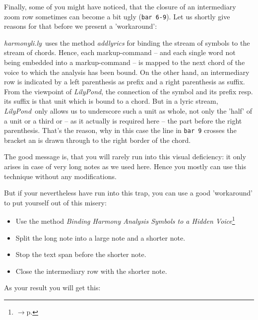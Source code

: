 \documentclass[
  DIV=calc,
  BCOR=5mm,
  12pt,
  headings=small,
  oneside,
  abstract=true,
  toc=bib,
  xcolor=dvipsnames,
  openany,
  ngerman,english]{scrartcl}
\newcommand{\acc}[0]{\textit}
\newcommand{\ra}[0]{$\rightarrow$}
\newcommand{\hlyn}[0]{\textit{harmonyli.ly}}
\newcommand{\lily}[0]{\textit{LilyPond}}
\newcommand{\has}[1]{\textit{Harmony Analysis Symbol#1}}
\begin{document}
Finally, some of you might have noticed, that the closure of an intermediary
zoom row sometimes can become a bit ugly (\texttt{bar 6-9}). Let us shortly
give reasons for that before we present a 'workaround':

\hlyn\ uses the method \acc{addlyrics} for binding the stream of symbols to the
stream of chords. Hence, each markup-command -- and each single word not being
embedded into a markup-command -- is mapped to the next chord of the voice to
which the analysis has been bound. On the other hand, an intermediary row is
indicated by a left parenthesis as prefix and a right parenthesis as suffix.
From the viewpoint of \lily, the connection of the symbol and its prefix resp.
its suffix is that unit which is bound to a chord. But in a lyric stream, \lily\
only allows us to underscore such a unit as whole, not only the 'half' of a unit
or a third or -- as it actually is required here -- the part before the right
parenthesis. That's the reason, why in this case the line in \texttt{bar 9}
crosses the bracket an is drawn through to the right border of the chord.

The good message is, that you will rarely run into this visual deficiency:
it only arises in case of very long notes as we used here. Hence you mostly can
use this technique without any modifications. 

But if your nevertheless have run into this trap, you can use a good
'workaround' to put yourself out of this misery:

\begin{itemize}
  \item Use the method \acc{Binding \has{s} to a Hidden Voice}\footnote{\ra p.
  \pageref{HiddenVoice}}
  \item Split the long note into a large note and a shorter note.
  \item Stop the text span before the shorter note.
  \item Close the intermediary row with the shorter note.
\end{itemize}

As your result you will get this:
\end{document}
